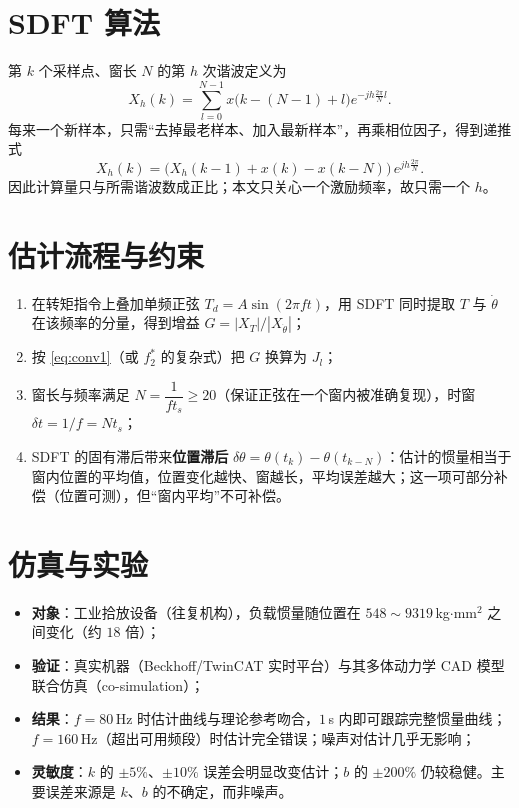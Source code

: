 \documentclass[UTF8,a4paper,11pt]{ctexart}
\begin{document}
\section{SDFT 算法}
第 $k$ 个采样点、窗长 $N$ 的第 $h$ 次谐波定义为
\begin{equation}
X_h(k)=\sum_{l=0}^{N-1}x\big(k-(N-1)+l\big)e^{-jh\frac{2\pi}{N}l}.
\end{equation}
每来一个新样本，只需“去掉最老样本、加入最新样本”，再乘相位因子，得到递推式
\begin{equation}
X_h(k)=\big(X_h(k-1)+x(k)-x(k-N)\big)\,e^{jh\frac{2\pi}{N}} .
\label{eq:sdf}
\end{equation}
因此计算量只与所需谐波数成正比；本文只关心一个激励频率，故只需一个 $h$。

\section{估计流程与约束}
\begin{enumerate}
  \item 在转矩指令上叠加单频正弦 $T_d=A\sin(2\pi f t)$，用 SDFT 同时提取 $T$ 与 $\dot\theta$ 在该频率的分量，得到增益 $G=|X_T|/|X_{\dot\theta}|$；
  \item 按 \eqref{eq:conv1}（或 $f_2^*$ 的复杂式）把 $G$ 换算为 $J_l$；
  \item 窗长与频率满足 $N=\dfrac{1}{f t_s}\ge 20$（保证正弦在一个窗内被准确复现），时窗 $\delta t=1/f=Nt_s$；
  \item SDFT 的固有滞后带来\textbf{位置滞后} $\delta\theta=\theta(t_k)-\theta(t_{k-N})$：估计的惯量相当于窗内位置的平均值，位置变化越快、窗越长，平均误差越大；这一项可部分补偿（位置可测），但“窗内平均”不可补偿。
\end{enumerate}

\section{仿真与实验}
\begin{itemize}
  \item \textbf{对象}：工业拾放设备（往复机构），负载惯量随位置在 $548\sim9319$\,kg$\cdot$mm$^2$ 之间变化（约 $18$ 倍）；
  \item \textbf{验证}：真实机器（Beckhoff/TwinCAT 实时平台）与其多体动力学 CAD 模型联合仿真（co-simulation）；
  \item \textbf{结果}：$f=80$\,Hz 时估计曲线与理论参考吻合，$1$\,s 内即可跟踪完整惯量曲线；$f=160$\,Hz（超出可用频段）时估计完全错误；噪声对估计几乎无影响；
  \item \textbf{灵敏度}：$k$ 的 $\pm5\%$、$\pm10\%$ 误差会明显改变估计；$b$ 的 $\pm200\%$ 仍较稳健。主要误差来源是 $k$、$b$ 的不确定，而非噪声。
\end{itemize}
\end{document}
